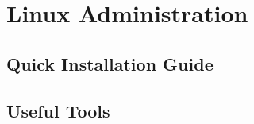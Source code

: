 \chapter{Linux Administration}


\section{Quick Installation Guide}




\section{Useful Tools}

















